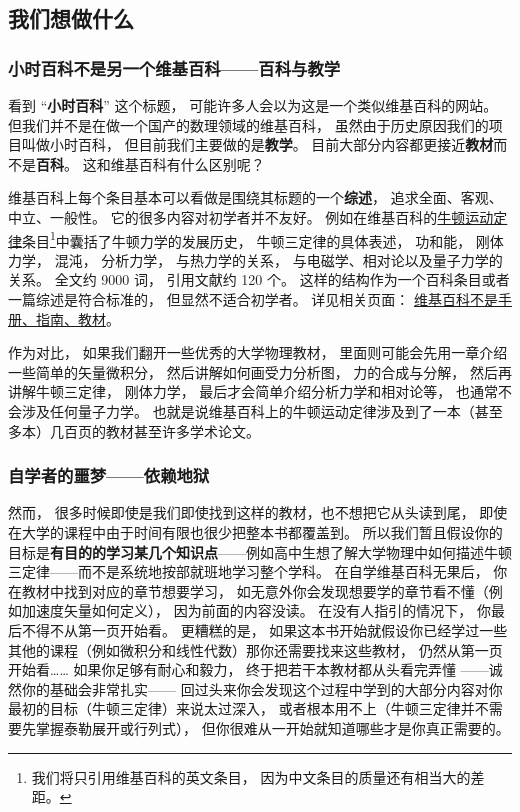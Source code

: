 
\subsection{我们想做什么}
\subsubsection{小时百科不是另一个维基百科——百科与教学}
看到 “\textbf{小时百科}” 这个标题， 可能许多人会以为这是一个类似维基百科的网站。 但我们并不是在做一个国产的数理领域的维基百科， 虽然由于历史原因我们的项目叫做小时百科， 但目前我们主要做的是\textbf{教学}。 目前大部分内容都更接近\textbf{教材}而不是\textbf{百科}。 这和维基百科有什么区别呢？

维基百科上每个条目基本可以看做是围绕其标题的一个\textbf{综述}， 追求全面、客观、中立、一般性。 它的很多内容对初学者并不友好。 例如在维基百科的\href{https://en.wikipedia.org/wiki/Newton's_laws_of_motion}{牛顿运动定律}条目\footnote{我们将只引用维基百科的英文条目， 因为中文条目的质量还有相当大的差距。}中囊括了牛顿力学的发展历史， 牛顿三定律的具体表述， 功和能， 刚体力学， 混沌， 分析力学， 与热力学的关系， 与电磁学、相对论以及量子力学的关系。 全文约 9000 词， 引用文献约 120 个。 这样的结构作为一个百科条目或者一篇综述是符合标准的， 但显然不适合初学者。 详见相关页面： \href{https://en.wikipedia.org/wiki/Wikipedia:What_Wikipedia_is_not}{维基百科不是手册、指南、教材}。

作为对比， 如果我们翻开一些优秀的大学物理教材， 里面则可能会先用一章介绍一些简单的矢量微积分， 然后讲解如何画受力分析图， 力的合成与分解， 然后再讲解牛顿三定律， 刚体力学， 最后才会简单介绍分析力学和相对论等， 也通常不会涉及任何量子力学。 也就是说维基百科上的牛顿运动定律涉及到了一本（甚至多本）几百页的教材甚至许多学术论文。

\subsubsection{自学者的噩梦——依赖地狱}
然而， 很多时候即使是我们即使找到这样的教材，也不想把它从头读到尾， 即使在大学的课程中由于时间有限也很少把整本书都覆盖到。 所以我们暂且假设你的目标是\textbf{有目的的学习某几个知识点}——例如高中生想了解大学物理中如何描述牛顿三定律——而不是系统地按部就班地学习整个学科。 在自学维基百科无果后， 你在教材中找到对应的章节想要学习， 如无意外你会发现想要学的章节看不懂（例如加速度矢量如何定义）， 因为前面的内容没读。 在没有人指引的情况下， 你最后不得不从第一页开始看。 更糟糕的是， 如果这本书开始就假设你已经学过一些其他的课程（例如微积分和线性代数）那你还需要找来这些教材， 仍然从第一页开始看…… 如果你足够有耐心和毅力， 终于把若干本教材都从头看完弄懂 ——诚然你的基础会非常扎实—— 回过头来你会发现这个过程中学到的大部分内容对你最初的目标（牛顿三定律）来说太过深入， 或者根本用不上（牛顿三定律并不需要先掌握泰勒展开或行列式）， 但你很难从一开始就知道哪些才是你真正需要的。

